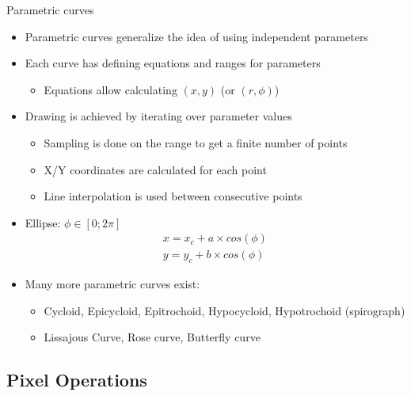 \begin{frame}{Parametric curves}
  \begin{itemize}
  \item Parametric curves generalize the idea of using independent parameters
  \item Each curve has defining equations and ranges for parameters
    \begin{itemize}
    \item Equations allow calculating \((x,y)\) (or \((r,\phi)\))
    \end{itemize}
  \item Drawing is achieved by iterating over parameter values
    \begin{itemize}
    \item Sampling is done on the range to get a finite number of points
    \item X/Y coordinates are calculated for each point
    \item Line interpolation is used between consecutive points
    \end{itemize}
  \item Ellipse: \(\phi \in [0;2\pi]\)
\begin{gather*}
x = x_c + a \times cos(\phi)\\
y = y_c + b \times cos(\phi)
\end{gather*}
  \item Many more parametric curves exist:
    \begin{itemize}
    \item Cycloid, Epicycloid, Epitrochoid, Hypocycloid, Hypotrochoid (spirograph)
    \item Lissajous Curve, Rose curve, Butterfly curve
    \end{itemize}
  \end{itemize}
\end{frame}

\subsection{Pixel Operations}

